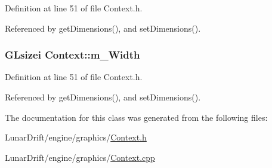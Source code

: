 Definition at line 51 of file Context.\+h.



Referenced by get\+Dimensions(), and set\+Dimensions().

\subsubsection[{\texorpdfstring{m\+\_\+\+Width}{m_Width}}]{\setlength{\rightskip}{0pt plus 5cm}G\+Lsizei Context\+::m\+\_\+\+Width\hspace{0.3cm}{\ttfamily [private]}}\hypertarget{class_context_a1813b1a12aaf96ec0ec501194bd56b41}{}\label{class_context_a1813b1a12aaf96ec0ec501194bd56b41}


Definition at line 51 of file Context.\+h.



Referenced by get\+Dimensions(), and set\+Dimensions().



The documentation for this class was generated from the following files\+:\begin{DoxyCompactItemize}
\item 
Lunar\+Drift/engine/graphics/\hyperlink{_context_8h}{Context.\+h}\item 
Lunar\+Drift/engine/graphics/\hyperlink{_context_8cpp}{Context.\+cpp}\end{DoxyCompactItemize}
